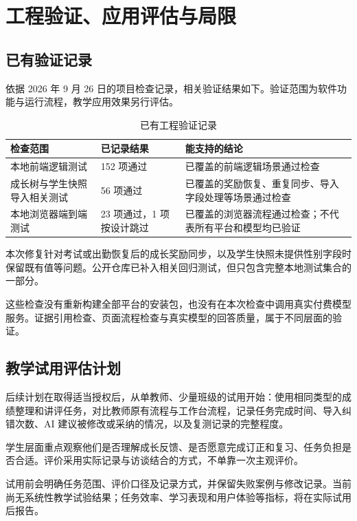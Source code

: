 \documentclass[11pt,a4paper,fontset=none]{ctexart}
\begin{document}
\section{工程验证、应用评估与局限}

\subsection{已有验证记录}

依据 2026 年 9 月 26 日的项目检查记录，相关验证结果如下。验证范围为软件功能与运行流程，教学应用效果另行评估。

\begin{table}[htbp]
\centering
\small
\begin{tabularx}{\textwidth}{@{}L{4.2cm}L{3.2cm}Y@{}}
\toprule
\textbf{检查范围} & \textbf{已记录结果} & \textbf{能支持的结论} \\
\midrule
本地前端逻辑测试 & 152 项通过 & 已覆盖的前端逻辑场景通过检查 \\
成长树与学生快照导入相关测试 & 56 项通过 & 已覆盖的奖励恢复、重复同步、导入字段处理等场景通过检查 \\
本地浏览器端到端测试 & 23 项通过，1 项按设计跳过 & 已覆盖的浏览器流程通过检查；不代表所有平台和模型均已验证 \\
\bottomrule
\end{tabularx}
\caption{已有工程验证记录}
\end{table}

本次修复针对考试或出勤恢复后的成长奖励同步，以及学生快照未提供性别字段时保留既有值等问题。公开仓库已补入相关回归测试，但只包含完整本地测试集合的一部分。

这些检查没有重新构建全部平台的安装包，也没有在本次检查中调用真实付费模型服务。证据引用检查、页面流程检查与真实模型的回答质量，属于不同层面的验证。

\subsection{教学试用评估计划}

后续计划在取得适当授权后，从单教师、少量班级的试用开始：使用相同类型的成绩整理和讲评任务，对比教师原有流程与工作台流程，记录任务完成时间、导入纠错次数、AI 建议被修改或采纳的情况，以及复测记录的完整程度。

学生层面重点观察他们是否理解成长反馈、是否愿意完成订正和复习、任务负担是否合适。评价采用实际记录与访谈结合的方式，不单靠一次主观评价。

试用前会明确任务范围、评价口径及记录方式，并保留失败案例与修改记录。当前尚无系统性教学试验结果；任务效率、学习表现和用户体验等指标，将在实际试用后报告。
\end{document}
